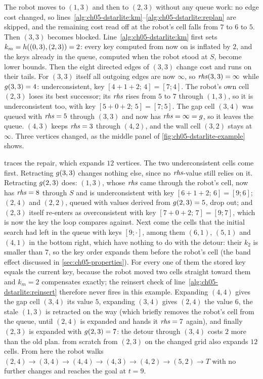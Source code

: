The robot moves to $(1,3)$ and then to $(2,3)$ without any queue work: no edge cost
changed, so lines~\ref{alg:ch05-dstarlite:km}--\ref{alg:ch05-dstarlite:replan} are
skipped, and the remaining cost read off at the robot's cell falls from $7$ to $6$ to
$5$. Then $(3,3)$ becomes blocked. Line~\ref{alg:ch05-dstarlite:km} first sets
$k_m = h((0,3),(2,3)) = 2$: every key computed from now on is inflated by $2$, and
the keys already in the queue, computed when the robot stood at $S$, become lower bounds.
Then the eight directed edges of $(3,3)$ change cost and \DslUpdateVertex runs on their
tails. For $(3,3)$ itself all outgoing edges are now $\infty$, so $\mathit{rhs}(3,3)=\infty$
while $g(3,3)=4$: underconsistent, key $[4+1+2;\,4]=[7;4]$. The robot's own cell
$(2,3)$ loses its best successor; its $\mathit{rhs}$ rises from $5$ to $7$ through $(1,3)$, so
it is underconsistent too, with key $[5+0+2;\,5]=[7;5]$. The gap cell $(3,4)$ was
queued with $\mathit{rhs}=5$ through $(3,3)$ and now has $\mathit{rhs}=\infty=g$, so it leaves the
queue. $(4,3)$ keeps $\mathit{rhs}=3$ through $(4,2)$, and the wall cell $(3,2)$ stays at
$\infty$. Three vertices changed, as the middle panel of
\cref{fig:ch05-dstarlite-example} shows.

 traces the repair, which expands $12$ vertices. The
two underconsistent cells come first. Retracting $g(3,3)$ changes nothing else,
since no $\mathit{rhs}$-value still relies on it. Retracting $g(2,3)$ does: $(1,3)$,
whose $\mathit{rhs}$ came through the robot's cell, now has $\mathit{rhs}=8$ through $S$ and is
underconsistent with key $[6+1+2;\,6]=[9;6]$; $(2,4)$ and $(2,2)$, queued with values
derived from $g(2,3)=5$, drop out; and $(2,3)$ itself re-enters as overconsistent
with key $[7+0+2;\,7]=[9;7]$, which is now the key the loop compares against. Next
come the cells that the initial search had left in the queue with keys $[9;\cdot]$,
among them $(6,1)$, $(5,1)$ and $(4,1)$ in the bottom right, which have nothing to do
with the detour: their $k_2$ is smaller than $7$, so the key order expands them before
the robot's cell (the band effect discussed in \cref{sec:ch05-properties}). For every
one of them the stored key equals the current key, because the robot moved two cells
straight toward them and $k_m=2$ compensates exactly; the reinsert check of
line~\ref{alg:ch05-dstarlite:reinsert} therefore never fires in this example.
Expanding $(4,4)$ gives the gap cell $(3,4)$ its value $5$, expanding $(3,4)$ gives
$(2,4)$ the value $6$, the stale $(1,3)$ is retracted on the way (which briefly removes
the robot's cell from the queue, until $(2,4)$ is expanded and hands it $\mathit{rhs}=7$
again), and finally $(2,3)$ is expanded with $g(2,3)=7$: the detour through
$(3,4)$ costs $2$ more than the old plan. \astar from scratch from $(2,3)$ on the
changed grid also expands $12$ cells. From here the robot walks
$(2,4)\to(3,4)\to(4,4)\to(4,3)\to(4,2)\to(5,2)\to T$ with no further changes and reaches
the goal at $t=9$.

